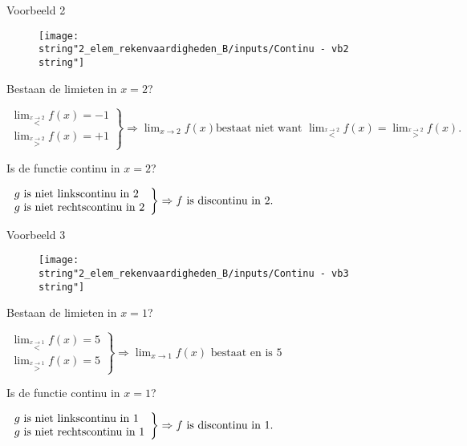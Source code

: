 \noindent Voorbeeld 2

\begin{figure}[h]
	\centering
	\texttt{[image: \\string"2\_elem\_rekenvaardigheden\_B/inputs/Continu - vb2\\string"]}
\end{figure}

Bestaan de limieten in $x=2$?

\begin{math}
\left. \begin{array}{l}
{\displaystyle\lim_{\overset{x\rightarrow2}{<}}}f(x)=-1 \\
{\displaystyle \lim_{\overset{x\rightarrow2}{>}}}f(x)=+1
\end{array}
\right\}
\Rightarrow{\displaystyle \lim_{x\to2}}f(x) \text{bestaat niet want } {\displaystyle\lim_{\overset{x\rightarrow2}{<}}}f(x) = {\displaystyle\lim_{\overset{x\rightarrow2}{>}}}f(x).
\end{math}

Is de functie continu in $x=2$?

\begin{math}
\centering
\left. \begin{array}{l}
g \text{ is niet linkscontinu in }2\\
g \text{ is niet rechtscontinu in }2
\end{array}
\right\}
\Rightarrow f \text{ is discontinu in }2.
\end{math}

\medskip{}


\noindent Voorbeeld 3

\begin{figure}[h]
	\centering
	\texttt{[image: \\string"2\_elem\_rekenvaardigheden\_B/inputs/Continu - vb3\\string"]}
\end{figure}

Bestaan de limieten in $x=1$?

\begin{math}
\left. \begin{array}{l}
{\displaystyle\lim_{\overset{x\rightarrow1}{<}}}f(x)=5 \\
{\displaystyle \lim_{\overset{x\rightarrow1}{>}}}f(x)=5
\end{array}
\right\}
\Rightarrow{\displaystyle \lim_{x\to1}}f(x) \text{ bestaat en is } 5
\end{math}

Is de functie continu in $x=1$?

\begin{math}
\centering
\left. \begin{array}{l}
g \text{ is niet linkscontinu in }1\\
g \text{ is niet rechtscontinu in }1
\end{array}
\right\}
\Rightarrow f \text{ is discontinu in }1.
\end{math}

